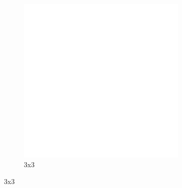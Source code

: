 \begin{figure}[h]
\begin{subfigure}[b]{0.3\textwidth}
        \includegraphics[width=0.9\textwidth]{../code/2_out/2-1_sp_3x3.png}
        \caption{3x3}
        \label{fig:2-1-1:2}
    \end{subfigure}


\end{figure}
